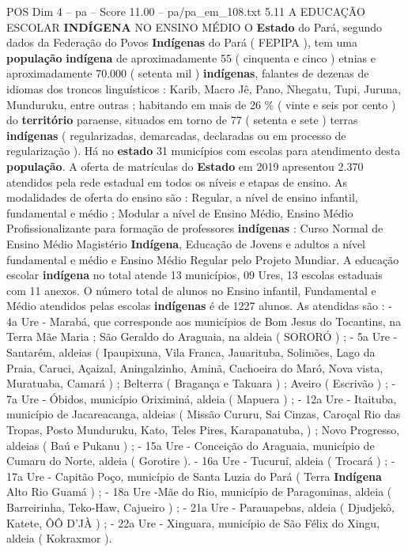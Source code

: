 \begin{textsample}{POS Dim 4 – pa – Score 11.00 – pa/pa\_em\_108.txt}  \label{ex:f4_pos_019}
5.11 A EDUCAÇÃO ESCOLAR \textbf{INDÍGENA} NO ENSINO MÉDIO O \textbf{Estado} do Pará, segundo dados da Federação do Povos \textbf{Indígenas} do Pará ( FEPIPA ), tem uma \textbf{população} \textbf{indígena} de aproximadamente 55 ( cinquenta e cinco ) etnias e aproximadamente 70.000 ( setenta mil ) \textbf{indígenas}, falantes de dezenas de idiomas dos troncos linguísticos : Karib, Macro Jê, Pano, Nhegatu, Tupi, Juruna, Munduruku, entre outras ; habitando em mais de 26 \% ( vinte e seis por cento ) do \textbf{território} paraense, situados em torno de 77 ( setenta e sete ) terras \textbf{indígenas} ( regularizadas, demarcadas, declaradas ou em processo de regularização ).
Há no \textbf{estado} 31 municípios com escolas para atendimento desta \textbf{população}.
A oferta de matrículas do \textbf{Estado} em 2019 apresentou 2.370 atendidos pela rede estadual em todos os níveis e etapas de ensino.
As modalidades de oferta do ensino são : Regular, a nível de ensino infantil, fundamental e médio ; Modular a nível de Ensino Médio, Ensino Médio Profissionalizante para formação de professores \textbf{indígenas} : Curso Normal de Ensino Médio Magistério \textbf{Indígena}, Educação de Jovens e adultos a nível fundamental e médio e Ensino Médio Regular pelo Projeto Mundiar.
A educação escolar \textbf{indígena} no total atende 13 municípios, 09 Ures, 13 escolas estaduais com 11 anexos.
O número total de alunos no Ensino infantil, Fundamental e Médio atendidos pelas escolas \textbf{indígenas} é de 1227 alunos.
As atendidas são : - 4a Ure - Marabá, que corresponde aos municípios de Bom Jesus do Tocantins, na Terra Mãe Maria ; São Geraldo do Araguaia, na aldeia ( SORORÓ ) ; - 5a Ure - Santarém, aldeias ( Ipaupixuna, Vila Franca, Jauarituba, Solimões, Lago da Praia, Caruci, Açaizal, Aningalzinho, Aminã, Cachoeira do Maró, Nova vista, Muratuaba, Camará ) ; Belterra ( Bragança e Takuara ) ; Aveiro ( Escrivão ) ; - 7a Ure - Óbidos, município Oriximiná, aldeia ( Mapuera ) ; - 12a Ure - Itaituba, município de Jacareacanga, aldeias ( Missão Cururu, Sai Cinzas, Caroçal Rio das Tropas, Posto Munduruku, Kato, Teles Pires, Karapanatuba, ) ; Novo Progresso, aldeias ( Baú e Pukanu ) ; - 15a Ure - Conceição do Araguaia, município de Cumaru do Norte, aldeia ( Gorotire ). - 16a Ure - Tucuruí, aldeia ( Trocará ) ; - 17a Ure - Capitão Poço, município de Santa Luzia do Pará ( Terra \textbf{Indígena} Alto Rio Guamá ) ; - 18a Ure -Mãe do Rio, município de Paragominas, aldeia ( Barreirinha, Teko-Haw, Cajueiro ) ; - 21a Ure - Parauapebas, aldeia ( Djudjekô, Katete, ÔÔ D'JÀ ) ; - 22a Ure - Xinguara, município de São Félix do Xingu, aldeia ( Kokraxmor ).

\end{textsample}
